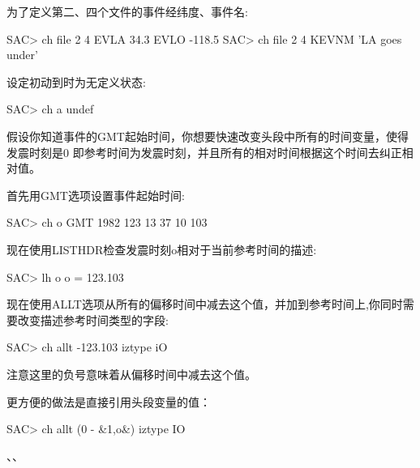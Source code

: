 为了定义第二、四个文件的事件经纬度、事件名:
\begin{SACCode}
SAC> ch file 2 4 EVLA 34.3 EVLO -118.5
SAC> ch file 2 4 KEVNM 'LA goes under'
\end{SACCode}

设定初动到时为无定义状态:
\begin{SACCode}
SAC> ch a undef
\end{SACCode}

假设你知道事件的GMT起始时间，你想要快速改变头段中所有的时间变量，使得发震时刻是0
即参考时间为发震时刻，并且所有的相对时间根据这个时间去纠正相对值。

首先用GMT选项设置事件起始时间:
\begin{SACCode}
SAC> ch o GMT 1982 123 13 37 10 103
\end{SACCode}
现在使用LISTHDR检查发震时刻o相对于当前参考时间的描述:
\begin{SACCode}
SAC> lh o
 o = 123.103
\end{SACCode}
现在使用ALLT选项从所有的偏移时间中减去这个值，并加到参考时间上,你同时需要改变描述参考时间类型的字段:
\begin{SACCode}
SAC> ch allt -123.103 iztype iO
\end{SACCode}
注意这里的负号意味着从偏移时间中减去这个值。

更方便的做法是直接引用头段变量的值：
\begin{SACCode}
SAC> ch allt (0 - &1,o&) iztype IO
\end{SACCode}

、、
